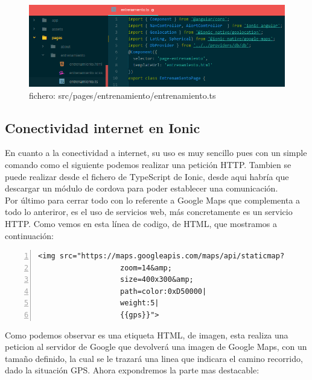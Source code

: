 \documentclass[a4paper, 11pt]{article}
\begin{document}
\begin{itemize}
                \begin{figure}[H]
                  \centering
                       \includegraphics[width=\textwidth]{entrenamientoTS}
                       \caption{fichero: src/pages/entrenamiento/entrenamiento.ts}
                       \label{f:entrenamientoTS}
                 \end{figure}

            \subsection{Conectividad internet en Ionic}

              En cuanto a la conectividad a internet, su uso es muy sencillo pues
              con un simple comando como el siguiente podemos realizar una petición
              HTTP. Tambien se puede realizar desde el fichero de TypeScript de
              Ionic, desde aqui habría que descargar un módulo de cordova para
              poder establecer una comunicación.\\

              Por último para cerrar todo con lo referente a Google Maps
              que complementa a todo lo anteriror, es el uso de servicios web,
              más concretamente es un servicio HTTP. Como vemos en esta línea de
              codigo, de HTML, que mostramos a continuación:\\

              \begin{lstlisting}[frame=single,numbers=left, numberstyle=\tiny, stepnumber=1, numbersep=-2pt]
    <img src="https://maps.googleapis.com/maps/api/staticmap?
                   zoom=14&amp;
                   size=400x300&amp;
                   path=color:0xD50000|
                   weight:5|
                   {{gps}}">
              \end{lstlisting}


              Como podemos observar es una etiqueta HTML, de imagen, esta realiza
              una peticion al servidor de Google que devolverá una imagen de
              Google Maps, con un tamaño definido, la cual se le trazará una linea
              que indicara el camino recorrido, dado la situación GPS. Ahora
              expondremos la parte mas destacable:\\



\end{itemize}
\end{document}
